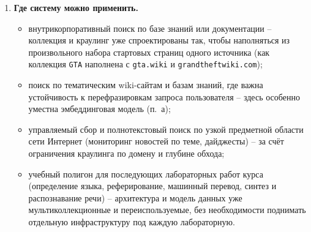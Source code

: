 \begin{enumerate}
\begin{itemize}
    \item расширение запроса синонимами и близкими по смыслу словами
    (например, через векторы слов spaCy или WordNet) -- частично закрыло
    бы разрыв словаря из п.~б без отказа от быстрой и прозрачной модели
    на TF-IDF;
    \item переход от бинарной релевантности к градуированной шкале и
    метрике nDCG, чтобы различать «точное совпадение» и «частично по
    теме», а не только «релевантно / нерелевантно»;
    \item приближённый индекс поиска по векторным представлениям
    (\texttt{ivfflat}/\texttt{hnsw} в pgvector) -- сейчас поиск по
    эмбеддингам выполняется полным перебором, что приемлемо только для
    учебного масштаба коллекции;
    \item полуавтоматическое пополнение эталонной разметки -- объединение
    (pooling) топ-$K$ выдачи обеих моделей в единый список кандидатов на
    разметку, чтобы быстрее набрать рекомендованные методикой 15--20
    тестовых запросов, не размечая вручную каждый документ с нуля;
    \item многопользовательский режим с сохранением истории запросов и
    персональной разметкой, если систему развивать за пределы учебного
    проекта.
  \end{itemize}
  \item \textbf{Где систему можно применить.}
  \begin{itemize}
    \item внутрикорпоративный поиск по базе знаний или документации --
    коллекция и краулинг уже спроектированы так, чтобы наполняться из
    произвольного набора стартовых страниц одного источника (как
    коллекция \texttt{GTA} наполнена с \texttt{gta.wiki} и
    \texttt{grandtheftwiki.com});
    \item поиск по тематическим wiki-сайтам и базам знаний, где важна
    устойчивость к перефразировкам запроса пользователя -- здесь
    особенно уместна эмбеддинговая модель (п.~а);
    \item управляемый сбор и полнотекстовый поиск по узкой предметной
    области сети Интернет (мониторинг новостей по теме, дайджесты) --
    за счёт ограничения краулинга по домену и глубине обхода;
    \item учебный полигон для последующих лабораторных работ курса
    (определение языка, реферирование, машинный перевод, синтез и
    распознавание речи) -- архитектура и модель данных уже
    мультиколлекционные и переиспользуемые, без необходимости
    поднимать отдельную инфраструктуру под каждую лабораторную.
  \end{itemize}
\end{enumerate}

